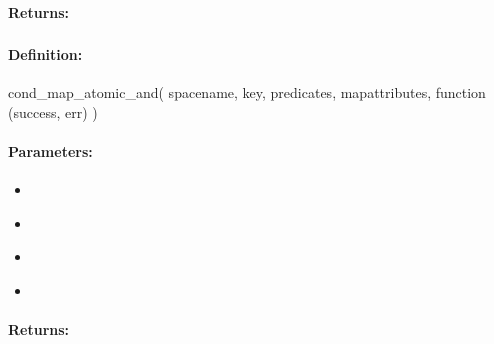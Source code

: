 \paragraph{Returns:}


\pagebreak
\subsubsection{}
\label{api:nodejs:cond_map_atomic_and}


\paragraph{Definition:}
\begin{javascriptcode}
cond_map_atomic_and(
        spacename, key, predicates, mapattributes, function (success, err) {})
\end{javascriptcode}
\paragraph{Parameters:}
\begin{itemize}[noitemsep]
\item {}\\

\item {}\\

\item {}\\

\item {}\\

\end{itemize}

\paragraph{Returns:}


\pagebreak
\subsubsection{}
\label{api:nodejs:map_atomic_or}


